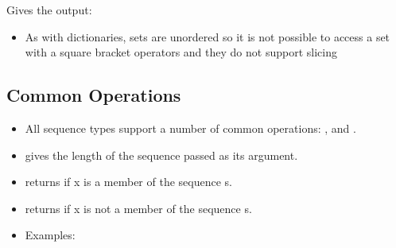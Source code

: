 \documentclass[letterpaper,10pt,english,openany]{sphinxmanual}
\begin{document}
Gives the output:

\begin{sphinxVerbatim}[commandchars=\\\{\}]
\PYG{p}{[} \PYG{p}{]}
\PYG{p}{[} \PYG{p}{]}
\end{sphinxVerbatim}
\begin{itemize}
\item {} 
As with dictionaries, sets are unordered so it is not possible to
access a set with a square bracket operators and they do not support
slicing

\end{itemize}


\subsection{Common Operations}
\label{\detokenize{introduction_to_python/more_sequence_types:common-operations}}\begin{itemize}
\item {} 
All sequence types support a number of common operations: ,
 and .

\item {} 
 gives the length of the sequence passed as its argument.

\item {} 
 returns  if x is a member of the sequence s.

\item {} 
 returns  if x is not a member of the sequence
s.

\item {} 
Examples:

\end{itemize}

\begin{sphinxVerbatim}[commandchars=\\\{\}]
  \PYG{p}{[}\PYG{p}{]}      

    
     
\end{sphinxVerbatim}
\end{document}
